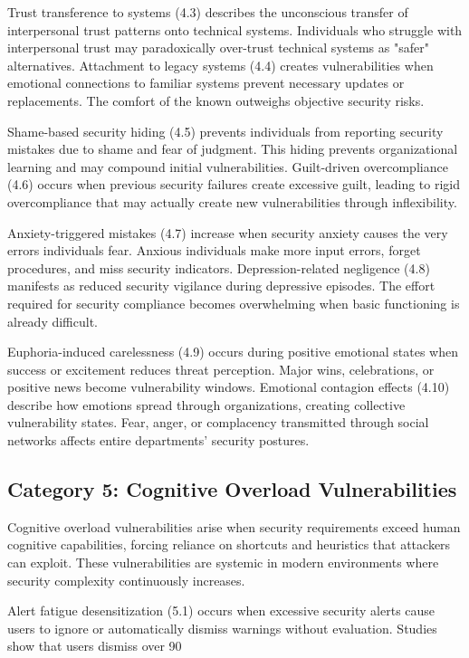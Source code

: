 \documentclass[11pt,a4paper]{article}
\begin{document}
Trust transference to systems (4.3) describes the unconscious transfer of interpersonal trust patterns onto technical systems. Individuals who struggle with interpersonal trust may paradoxically over-trust technical systems as "safer" alternatives. Attachment to legacy systems (4.4) creates vulnerabilities when emotional connections to familiar systems prevent necessary updates or replacements. The comfort of the known outweighs objective security risks.

Shame-based security hiding (4.5) prevents individuals from reporting security mistakes due to shame and fear of judgment. This hiding prevents organizational learning and may compound initial vulnerabilities. Guilt-driven overcompliance (4.6) occurs when previous security failures create excessive guilt, leading to rigid overcompliance that may actually create new vulnerabilities through inflexibility.

Anxiety-triggered mistakes (4.7) increase when security anxiety causes the very errors individuals fear. Anxious individuals make more input errors, forget procedures, and miss security indicators. Depression-related negligence (4.8) manifests as reduced security vigilance during depressive episodes. The effort required for security compliance becomes overwhelming when basic functioning is already difficult.

Euphoria-induced carelessness (4.9) occurs during positive emotional states when success or excitement reduces threat perception. Major wins, celebrations, or positive news become vulnerability windows. Emotional contagion effects (4.10) describe how emotions spread through organizations, creating collective vulnerability states. Fear, anger, or complacency transmitted through social networks affects entire departments' security postures.

\subsection{Category 5: Cognitive Overload Vulnerabilities}

Cognitive overload vulnerabilities arise when security requirements exceed human cognitive capabilities, forcing reliance on shortcuts and heuristics that attackers can exploit. These vulnerabilities are systemic in modern environments where security complexity continuously increases.

Alert fatigue desensitization (5.1) occurs when excessive security alerts cause users to ignore or automatically dismiss warnings without evaluation. Studies show that users dismiss over 90%
\end{document}
